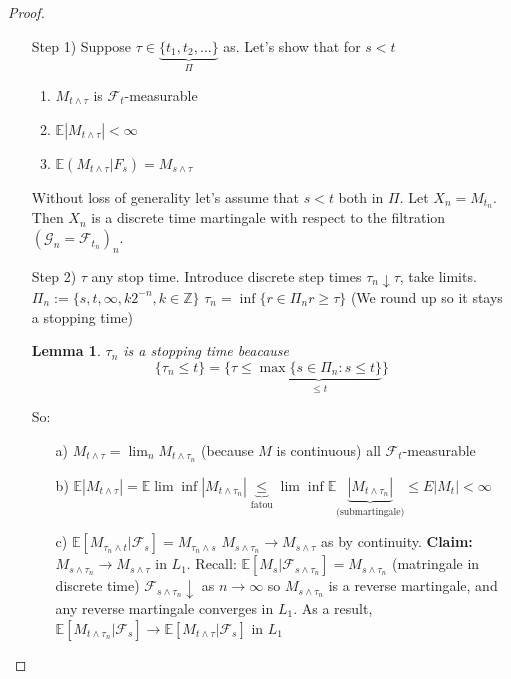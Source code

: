 \documentclass{article}
\newtheorem{lemma}[theorem]{Lemma}
\newcommand{\esp}{{\mathbb E}}
\begin{document}
\begin{proof}
  \begin{enumerate}
  \item[Step 1)]
    Suppose $\tau \in \underbrace{\{t_1, t_2, \ldots\}}_{\Pi}$ as. Let's show that for $s < t$
    \begin{enumerate}
    \item $M_{t\wedge \tau}$ is $\mathcal F_t$-measurable
    \item $\mathbb E |M_{t\wedge \tau}| < \infty$
    \item $\mathbb E(M_{t\wedge \tau} |F_s) = M_{s \wedge \tau}$
    \end{enumerate}

    Without loss of generality let's assume that $s < t$ both in $\Pi$.
    Let $X_n = M_{t_n}$. Then $X_n$ is a discrete time martingale with respect to the filtration $(\mathcal G_n = \mathcal F_{t_n})_n$.
  \item[Step 2)]
    $\tau$ any stop time.
    Introduce discrete step times $\tau_n \downarrow \tau$, take limits.
    $\Pi_n := \{ s, t, \infty, k2^{-n}, k \in \mathbb Z\}$
    $\tau_n = \inf \{ r \in \Pi_n r \ge \tau \}$ (We round up so it stays a stopping time)
    \begin{lemma}
      $\tau_n$ is a stopping time beacause $$\{ \tau_n \le t \} = \{ \tau \le \underbrace{\max \{s \in \Pi_n : s \le t \}}_{\le t} \}$$
    \end{lemma}
    So:
    \begin{itemize}
    \item[a)] $M_{t\wedge \tau} = \lim_n M_{t \wedge \tau_n}$ (because $M$ is continuous) all $\mathcal F_t$-measurable
    \item[b)] $\mathbb E|M_{t \wedge \tau}|  = \mathbb E \lim\inf |M_{t \wedge \tau_n}| \underbrace{\le}_{\text{fatou}} \lim\inf \mathbb E \underbrace{|M_{t \wedge \tau_n}|}_{\text{(submartingale)}} \le E|M_t| < \infty$
      
    \item[c)]$\esp[M_{\tau_n \wedge t} | \mathcal F_s] = M_{\tau_n \wedge s}$
      $M_{s \wedge \tau_n} \rightarrow M_{s \wedge \tau}$ as by continuity.
      \textbf{Claim:} $M_{s \wedge \tau_n} \rightarrow M_{s \wedge \tau}$ in $L_1$.
      Recall: $\esp[M_s | \mathcal F_{s \wedge \tau_n}] = M_{s \wedge \tau_n}$ (matringale in discrete time)
      $\mathcal F_{s \wedge \tau_n} \downarrow$ as $n \rightarrow \infty$ so $M_{s \wedge \tau_n}$ is a reverse martingale, and any reverse martingale converges in $L_1$.
      As a result, $\esp [M_{t \wedge \tau_n} | \mathcal F_s] \rightarrow \esp [M_{t \wedge \tau} | \mathcal F_s]$ in $L_1$
    \end{itemize}

  \end{enumerate}
\end{proof}
\end{document}
